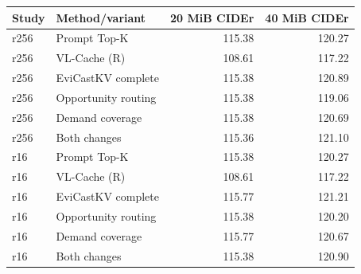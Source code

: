 \begin{tabular}{llrr}
\toprule
Study & Method/variant & 20 MiB CIDEr & 40 MiB CIDEr\\\midrule
r256 & Prompt Top-K & 115.38 & 120.27\\
r256 & VL-Cache (R) & 108.61 & 117.22\\
r256 & EviCastKV complete & 115.38 & 120.89\\
r256 & Opportunity routing & 115.38 & 119.06\\
r256 & Demand coverage & 115.38 & 120.69\\
r256 & Both changes & 115.36 & 121.10\\
r16 & Prompt Top-K & 115.38 & 120.27\\
r16 & VL-Cache (R) & 108.61 & 117.22\\
r16 & EviCastKV complete & 115.77 & 121.21\\
r16 & Opportunity routing & 115.38 & 120.20\\
r16 & Demand coverage & 115.77 & 120.67\\
r16 & Both changes & 115.38 & 120.90\\
\bottomrule
\end{tabular}
